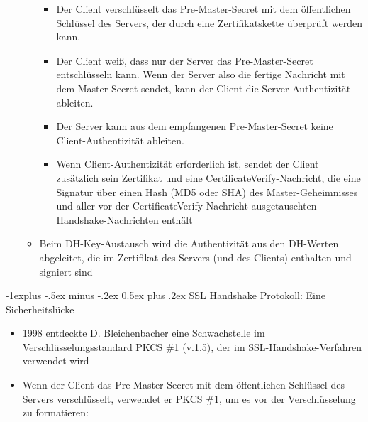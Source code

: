 \documentclass[a4paper]{article}
\makeatletter
\renewcommand{\subsection}{\@startsection{subsection}{2}{0mm}%
 {-1explus -.5ex minus -.2ex}%
 {0.5ex plus .2ex}%
 {\normalfont\normalsize\bfseries}}
\makeatother
\begin{document}
\begin{multicols}{3}
\begin{itemize}
\begin{itemize}
                        \begin{itemize}
                            \item
                                  Der Client verschlüsselt das Pre-Master-Secret mit dem
                                  öffentlichen Schlüssel des Servers, der durch eine
                                  Zertifikatskette überprüft werden kann.
                            \item
                                  Der Client weiß, dass nur der Server das Pre-Master-Secret
                                  entschlüsseln kann. Wenn der Server also die fertige Nachricht mit
                                  dem Master-Secret sendet, kann der Client die Server-Authentizität
                                  ableiten.
                            \item
                                  Der Server kann aus dem empfangenen Pre-Master-Secret keine
                                  Client-Authentizität ableiten.
                            \item
                                  Wenn Client-Authentizität erforderlich ist, sendet der Client
                                  zusätzlich sein Zertifikat und eine CertificateVerify-Nachricht,
                                  die eine Signatur über einen Hash (MD5 oder SHA) des
                                  Master-Geheimnisses und aller vor der CertificateVerify-Nachricht
                                  ausgetauschten Handshake-Nachrichten enthält
                        \end{itemize}
                  \item
                        Beim DH-Key-Austausch wird die Authentizität aus den DH-Werten
                        abgeleitet, die im Zertifikat des Servers (und des Clients)
                        enthalten und signiert sind
              \end{itemize}
    \end{itemize}


    \subsection{SSL Handshake Protokoll: Eine
        Sicherheitslücke}

    \begin{itemize}
        \item
              1998 entdeckte D. Bleichenbacher eine Schwachstelle im
              Verschlüsselungsstandard PKCS \#1 (v.1.5), der im
              SSL-Handshake-Verfahren verwendet wird
        \item
              Wenn der Client das Pre-Master-Secret mit dem öffentlichen Schlüssel
              des Servers verschlüsselt, verwendet er PKCS \#1, um es vor der
              Verschlüsselung zu formatieren:


\end{itemize}
\end{multicols}
\end{document}
